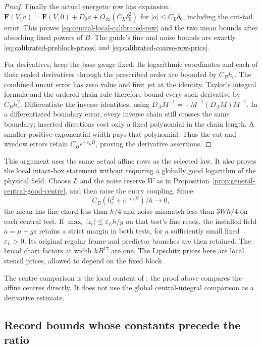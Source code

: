 \documentclass[11pt,reqno]{amsart}
\numberwithin{equation}{section}
\theoremstyle{definition}
\theoremstyle{remark}
\begin{document}
\begin{proof}
Finally the actual energetic row has expansion
\(\mathbf F(V,a)=\mathbf F(V,0)+D_0a+O_\infty(C_L\delta_0^2)
\) for \(|a|\le C_L\delta_0\), including the cut-tail error.
This proves \eqref{eq:central-local-calibrated-row} and the
two mean bounds after absorbing fixed powers of \(B\).
The guide's fine and noise bounds are exactly
\eqref{eq:calibrated-preblock-prices} and
\eqref{eq:calibrated-coarse-row-price}.

For derivatives, keep the base gauge fixed. Its logarithmic
coordinates and each of their scaled derivatives through the
prescribed order are bounded by \(C_Bh_c\). The combined
uncut error has zero value and first jet at the identity.
Taylor's integral formula and the ordered chain rule therefore
bound every such derivative by \(C_Bh_c^2\). Differentiate
the inverse identities, using
\(D_A M^{-1}=-M^{-1}(D_AM)M^{-1}\). In a differentiated
boundary error, every inverse chain still crosses the same
boundary; inserted directions cost only a fixed polynomial
in the chain length. A smaller positive exponential width
pays that polynomial. Thus the cut and window errors retain
\(C_Be^{-c_LB}\), proving the derivative assertions.
\end{proof}

This argument uses the same actual affine rows as the selected
law. It also proves the local intact-box statement without
requiring a globally good logarithm of the physical field.
Choose \(L\) and the noise reserve \(W\) as in
Proposition~\ref{prop:general-central-good-centre}, and then
raise the entry coupling. Since
\[
 C_B(h_c^2+e^{-c_LB})/h\longrightarrow0,
\]
the mean has fine chord less than \(h/4\) and noise mismatch
less than \(3Wh/4\) on each central test. If
\(\max_e|z_e|\le\varepsilon_Lh/g\) on that test's fine reads,
the installed field \(a=\mu+gz\) retains a strict margin in
both tests, for a sufficiently small fixed
\(\varepsilon_L>0\). Its original regular frame and predictor
branches are then retained. The broad chart factors at width
\(hB^{17}\) are one. The Lipschitz prices here are local
stencil prices, allowed to depend on the fixed block.

The centre comparison is the local content of
\cite[Lemma~25.4, pp.~137--138, and Lemma~28.5,
pp.~156--158]{Main}; the proof above compares
the affine centres directly. It does not use the global
central-integral comparison as a derivative estimate.

\subsection{Record bounds whose constants precede the ratio}
\end{document}
